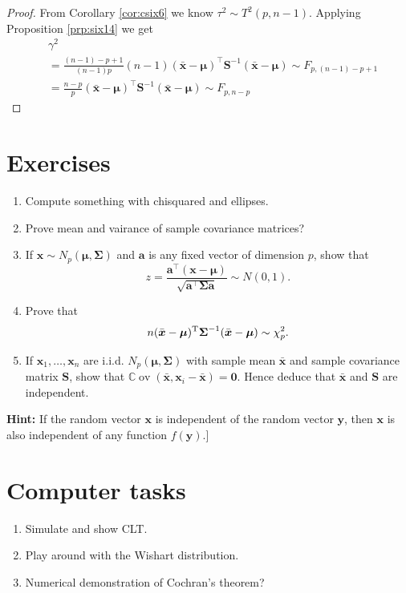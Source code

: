 \documentclass[]{book}
\theoremstyle{definition}
\theoremstyle{definition}
\theoremstyle{definition}
\theoremstyle{remark}
\begin{document}
\begin{proof}
{}From Corollary \ref{cor:csix6} we know \(\tau^2 \sim T^2(p,n-1)\). Applying Proposition \ref{prp:six14} we get
\begin{align*}
&\gamma^2\\
& = \frac{(n-1)-p+1}{(n-1)p}(n-1)(\bar{\boldsymbol x}-\boldsymbol \mu)^\top \boldsymbol S^{-1} (\bar{\boldsymbol x}-\boldsymbol \mu) \sim F_{p,(n-1)-p+1} \\
&= \frac{n-p}{p}(\bar{\boldsymbol x}-\boldsymbol \mu)^\top \boldsymbol S^{-1} (\bar{\boldsymbol x}-\boldsymbol \mu) \sim F_{p,n-p}
\end{align*}
\end{proof}

\hypertarget{exercises-4}{%
\section{Exercises}\label{exercises-4}}

\begin{enumerate}
\def\labelenumi{\arabic{enumi}.}
\item
  Compute something with chisquared and ellipses.
\item
  Prove mean and vairance of sample covariance matrices?
\item
  If \(\boldsymbol x\sim N_p(\boldsymbol \mu,\boldsymbol \Sigma)\) and \(\boldsymbol a\) is any fixed vector of dimension \(p\), show that
  \[ z = \frac{ \boldsymbol a^\top (\boldsymbol x- \boldsymbol \mu) }{ \sqrt{\boldsymbol a^\top \boldsymbol \Sigma\boldsymbol a} } \sim N(0,1).\]
\item
  Prove that
  \[ n ( \bar{\boldsymbol x} - \boldsymbol \mu)^{\rm T} \boldsymbol \Sigma^{-1} ( \bar{\boldsymbol x} - \boldsymbol \mu) \sim \chi_p^2 . \]
\item
  If \(\boldsymbol x_1, \ldots, \boldsymbol x_n\) are i.i.d. \(N_p(\boldsymbol \mu, \boldsymbol \Sigma)\) with sample mean \(\bar{\boldsymbol x}\) and sample covariance matrix \(\boldsymbol S\), show that \({\mathbb{C}\operatorname{ov}}(\bar{\boldsymbol x}, \boldsymbol x_i - \bar{\boldsymbol x}) = \boldsymbol 0\). Hence deduce that \(\bar{\boldsymbol x}\) and \(\boldsymbol S\) are independent.
\end{enumerate}

\textbf{Hint:} If the random vector \(\boldsymbol x\) is independent of the random vector \(\boldsymbol y\), then \(\boldsymbol x\) is also independent of any function \(f(\boldsymbol y)\).{]}

\hypertarget{computer-tasks-3}{%
\section{Computer tasks}\label{computer-tasks-3}}

\begin{enumerate}
\def\labelenumi{\arabic{enumi}.}
\item
  Simulate and show CLT.
\item
  Play around with the Wishart distribution.
\item
  Numerical demonstration of Cochran's theorem?
\end{enumerate}


\end{document}
